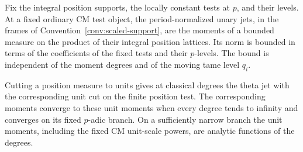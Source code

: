\begin{lemma}\label{lem:unary-moments}
 Fix the integral position supports, the locally constant tests at $p$,
 and their levels.  At a fixed ordinary CM test object, the
 period-normalized unary jets, in the frames of
 Convention~\ref{conv:scaled-support}, are the moments of a bounded
 measure on the product of their integral position lattices.  Its norm
 is bounded in terms of the coefficients of the fixed tests and their
 $p$-levels.  The bound is independent of the moment degrees and of the
 moving tame level $q_i$.

 Cutting a position measure to units gives at classical degrees the
 theta jet with the corresponding unit cut on the finite position test.
 The corresponding moments converge to these unit moments when every
 degree tends to infinity and converges on its fixed $p$-adic branch.
 On a
 sufficiently narrow branch the unit moments, including the fixed CM
 unit-scale powers, are analytic functions of the degrees.
\end{lemma}
